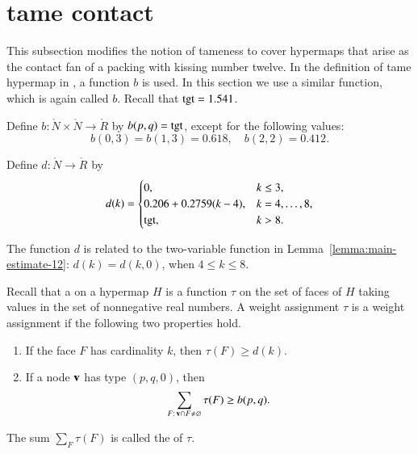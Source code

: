 \documentclass{llncs}
\def\op#1{{\hbox{#1}}}
\begin{document}
\section{tame contact}

This subsection modifies the notion of tameness to cover hypermaps
that arise as the contact fan of a packing with kissing number twelve.  In the
definition of tame hypermap in \cite{DSP}, a function $b$
is used.  In this section we use a similar function,  which is
again called $b$.   Recall that $\op{tgt}=1.541$.  %
%

\begin{definition}[b]
  Define $b:\ring{N}\times \ring{N}\to \ring{R}$ by
  $b\pqr{(p,q)}=\op{tgt}$, except for the following values:
\[
b(0,3)=b(1,3)=0.618,\quad b(2,2)=0.412.
\]
\end{definition}
%

\begin{definition}[d]
Define $d:\ring{N}\to \ring{R}$ by
\[d(k) = \begin{cases}
0, & k\le 3, \\
0.206 + 0.2759 (k-4),& k=4,\ldots,8,\\
\op{tgt},& k>8.\\
\end{cases}
\]
\end{definition}
%

The function $d$ is related to the two-variable function in
Lemma~\ref{lemma:main-estimate-12}: $d(k) = d(k,0)$, when $4\le k\le
8$.

%
%
\begin{definition}
%
  Recall that a  
on a hypermap $H$ is a
  function $\tau$ on the set of faces of $H$ taking values in the set
  of nonnegative real numbers. A weight assignment $\tau$
is a 
  weight assignment if the following two properties hold.
%
\begin{enumerate}
\item If the face $F$ has cardinality $k$, then
$\tau(F) \ge d(k)$.
\item If a node ${\mathbf v}$ has type $(p,q,0)$, then
  \[\sum_{F:\,{\mathbf v}\cap F\ne\varnothing} \tau(F) \ge
    b{(p,q)}.\]
\end{enumerate}
The sum $\sum_F \tau(F)$ is called the  of $\tau$.
\end{definition}
%
\end{document}

